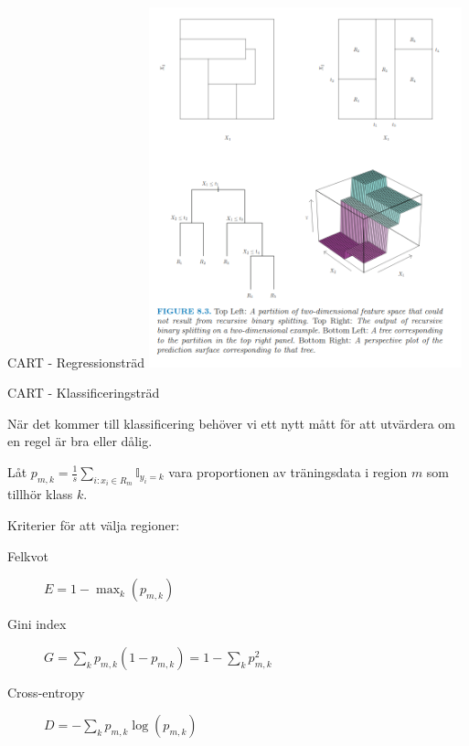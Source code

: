 \documentclass[10pt,english]{beamer}
\begin{document}
\begin{frame}{CART - Regressionsträd}
    \includegraphics[width=0.68\textwidth]{figs/reg_tree_surface.png}
\end{frame}

\begin{frame}{CART - Klassificeringsträd}
    
    När det kommer till klassificering behöver vi ett nytt mått för att utvärdera om en regel är bra eller dålig.

    Låt $p_{m,k} = \frac{1}{s} \sum_{i : x_i \in R_m} \mathbb{I}_{y_i = k}$ vara proportionen av träningsdata i region $m$ som tillhör klass $k$.

    Kriterier för att välja regioner:
    \begin{description}
        \item[Felkvot] $E = 1 - \max_{k} (p_{m,k})$
        \item[Gini index] $G = \sum_{k} p_{m,k} ( 1 - p_{m,k}) = 1 - \sum_{k} p_{m,k}^2$
        \item[Cross-entropy] $D = - \sum_{k} p_{m,k} \log(p_{m,k})$   
    \end{description}

\end{frame}
\end{document}
